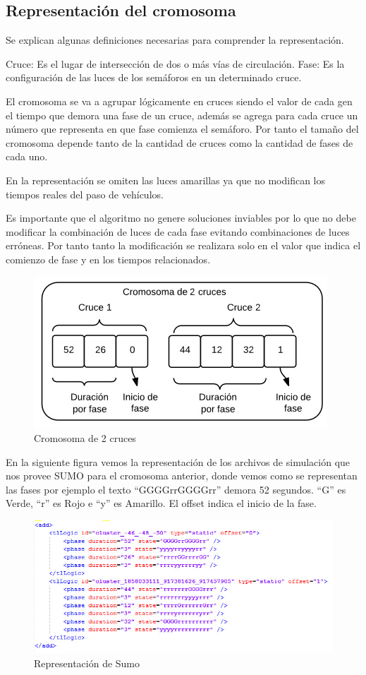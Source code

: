  

\subsection{Representación del cromosoma}

Se explican algunas definiciones necesarias para comprender la representación.

Cruce: Es el lugar de intersección de dos o más vías de circulación.
Fase: Es la configuración de las luces de los semáforos en un determinado cruce.

El  cromosoma  se  va  a  agrupar  lógicamente  en  cruces siendo el valor de cada gen el tiempo que demora una
fase de un cruce, además se agrega para cada cruce un número que representa en que fase comienza el semáforo. 
Por tanto el tamaño del cromosoma depende tanto de la cantidad de cruces como la cantidad de fases de cada uno.

En la representación se omiten las luces amarillas ya que no modifican los tiempos reales del paso de vehículos.
 
Es  importante que el algoritmo no genere soluciones inviables por lo que no debe modificar la combinación de luces de cada fase evitando combinaciones de luces erróneas. Por tanto tanto la modificación se realizara solo en el valor que indica el comienzo de fase y en los tiempos relacionados.

\begin{figure}[h]
\centering
\includegraphics[width=0.7\linewidth]{Figures/cromosoma1}
\caption{Cromosoma de 2 cruces}
\label{fig:cromosoma1}
\end{figure}

En la siguiente figura vemos la representación de los archivos de simulación que nos provee SUMO para el cromosoma anterior, donde vemos como se representan las fases por ejemplo el texto “GGGGrrGGGGrr” demora 52 segundos. “G” es Verde, “r” es Rojo e “y” es Amarillo. El offset indica el inicio de la fase.

\begin{figure}[h]
\centering
\includegraphics[width=\linewidth]{Figures/rep_sumo}
\caption{Representación de Sumo}
\label{fig:rep_sumo}
\end{figure}


